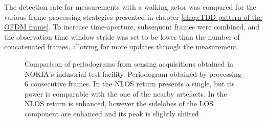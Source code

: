 The detection rate for measurements with a walking actor was compared for the various frame processing strategies presented in chapter \ref{chap:TDD pattern of the OFDM frame}. To increase time-aperture, subsequent frames were combined, and the observation time window stride was set to be lower than the number 
of concatenated frames, allowing for more updates through the measurement.
\begin{figure}[t]
	\centering
	
	\hfill
	\caption[]{\small Comparison of periodograms from sensing acquisitions obtained in NOKIA's industrial test facility.
		Periodogram obtained by processing 6 consecutive frames.
		In  the NLOS return presents a single, but its power is comparable with the one of the nearby artefacts. In  the NLOS return is enhanced, however the sidelobes of the LOS component are enhanced and its peak is slightly shifted.}
	\label{fig:Test1_huma_crap-ecac}
\end{figure}
